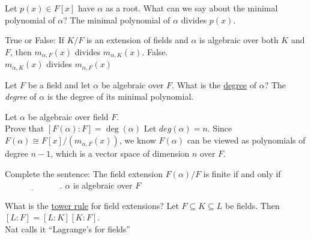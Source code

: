 \documentclass[avery5371,grid]{flashcards}
\newcommand{\blank}{$\; \underline{\hspace{1in}} \; $}
\begin{document}
\begin{flashcard}[Fields]{Let $p(x) \in F[x]$ have $\alpha$ as a root. What can we say about the minimal polynomial of $\alpha$?}
 The minimal polynomial of $\alpha$ divides $p(x)$.
\end{flashcard}

\begin{flashcard}[Fields]{True or False: If $K/F$ is an extension of fields and $\alpha$ is algebraic over both $K$ and $F$, then $m_{\alpha,F}(x)$ divides $m_{\alpha, K}(x)$.}
 False. \\
 
 $m_{\alpha,K}(x)$ divides $m_{\alpha, F}(x)$
\end{flashcard}

\begin{flashcard}[Fields]{Let $F$ be a field and let $\alpha$ be algebraic over $F$. What is the \underline{degree} of $\alpha$?}
 The \emph{degree} of $\alpha$ is the degree of its minimal polynomial.
\end{flashcard}

\begin{flashcard}[Fields]{Let $\alpha$ be algebraic over field $F$. \\Prove that $[F(\alpha):F] = \deg(\alpha)$}
 Let $deg(\alpha) = n$. Since $F(\alpha) \cong F[x]/(m_{\alpha,F}(x))$, we know $F(\alpha)$ can be viewed as polynomials of degree $n-1$, which is a vector space of dimension $n$ over $F$.
\end{flashcard}

\begin{flashcard}[Fields]{Complete the sentence: The field extension $F(\alpha)/F$ is finite if and only if \blank.}
 $\alpha$ is algebraic over $F$
\end{flashcard}

\begin{flashcard}[Fields]{What is the \underline{tower rule} for field extensions?}
 Let $F \subseteq K \subseteq L$ be fields. Then $[L:F] = [L:K][K:F]$.\\
 
 Nat calls it ``Lagrange's for fields''
\end{flashcard}
\end{document}

